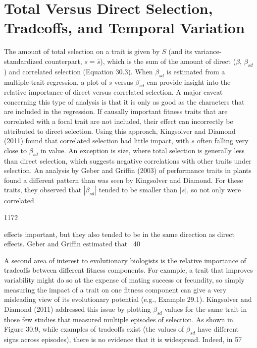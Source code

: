 \documentclass{article}
\begin{document}
\section{Total Versus Direct Selection, Tradeoffs, and Temporal Variation}
The amount of total selection on a trait is given by $S$ (and its variance-standardized counterpart, $s = \bar{s}$), which is the sum of the amount of direct ($\beta$, $\beta_{sd}$) and correlated selection (Equation 30.3). When $\beta_{sd}$ is estimated from a multiple-trait regression, a plot of $s$ versus $\beta_{sd}$ can provide insight into the relative importance of direct versus correlated selection. A major caveat concerning this type of analysis is that it is only as good as the characters that are included in the regression. If causally important fitness traits that are correlated with a focal trait are not included, their effect can incorrectly be attributed to direct selection. Using this approach, Kingsolver and Diamond (2011) found that correlated selection had little impact, with $s$ often falling very close to $\beta_{sd}$ in value. An exception is size, where total selection is generally less than direct selection, which suggests negative correlations with other traits under selection. An analysis by Geber and Griffin (2003) of performance traits in plants found a different pattern than was seen by Kingsolver and Diamond. For these traits, they observed that $|\beta_{sd}|$ tended to be smaller than $|s|$, so not only were correlated

1172

effects important, but they also tended to be in the same direction as direct effects. Geber and Griffin estimated that ~40%

A second area of interest to evolutionary biologists is the relative importance of tradeoffs between different fitness components. For example, a trait that improves variability might do so at the expense of mating success or fecundity, so simply measuring the impact of a trait on one fitness component can give a very misleading view of its evolutionary potential (e.g., Example 29.1). Kingsolver and Diamond (2011) addressed this issue by plotting  $ \beta_{sd} $ values for the same trait in those few studies that measured multiple episodes of selection. As shown in Figure 30.9, while examples of tradeoffs exist (the values of  $ \beta_{sd} $ have different signs across episodes), there is no evidence that it is widespread. Indeed, in 57%
\end{document}
